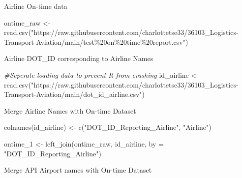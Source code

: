 \documentclass[
]{article}
\newenvironment{Shaded}{\begin{snugshade}}{\end{snugshade}}
\newcommand{\AttributeTok}[1]{\textcolor[rgb]{0.77,0.63,0.00}{#1}}
\newcommand{\CommentTok}[1]{\textcolor[rgb]{0.56,0.35,0.01}{\textit{#1}}}
\newcommand{\FunctionTok}[1]{\textcolor[rgb]{0.00,0.00,0.00}{#1}}
\newcommand{\NormalTok}[1]{#1}
\newcommand{\OtherTok}[1]{\textcolor[rgb]{0.56,0.35,0.01}{#1}}
\newcommand{\StringTok}[1]{\textcolor[rgb]{0.31,0.60,0.02}{#1}}
\begin{document}
Airline On-time data

\begin{Shaded}
\begin{Highlighting}[]
\NormalTok{ontime\_raw }\OtherTok{\textless{}{-}} \FunctionTok{read.csv}\NormalTok{(}\StringTok{"https://raw.githubusercontent.com/charlottetse33/36103\_Logistics{-}Transport{-}Aviation/main/test\%20on\%20time\%20report.csv"}\NormalTok{)}
\end{Highlighting}
\end{Shaded}

Airline DOT\_ID corresponding to Airline Names

\begin{Shaded}
\begin{Highlighting}[]
\CommentTok{\#Seperate loading data to prevent R from crashing}
\NormalTok{id\_airline }\OtherTok{\textless{}{-}} \FunctionTok{read.csv}\NormalTok{(}\StringTok{"https://raw.githubusercontent.com/charlottetse33/36103\_Logistics{-}Transport{-}Aviation/main/dot\_id\_airline.csv"}\NormalTok{)}
\end{Highlighting}
\end{Shaded}

Merge Airline Names with On-time Dataset

\begin{Shaded}
\begin{Highlighting}[]
\FunctionTok{colnames}\NormalTok{(id\_airline) }\OtherTok{\textless{}{-}} \FunctionTok{c}\NormalTok{(}\StringTok{"DOT\_ID\_Reporting\_Airline"}\NormalTok{, }\StringTok{"Airline"}\NormalTok{)}
  
\NormalTok{ontime\_1 }\OtherTok{\textless{}{-}} \FunctionTok{left\_join}\NormalTok{(ontime\_raw, id\_airline, }\AttributeTok{by =} \StringTok{"DOT\_ID\_Reporting\_Airline"}\NormalTok{)}
\end{Highlighting}
\end{Shaded}

Merge API Airport names with On-time Dataset
\end{document}
